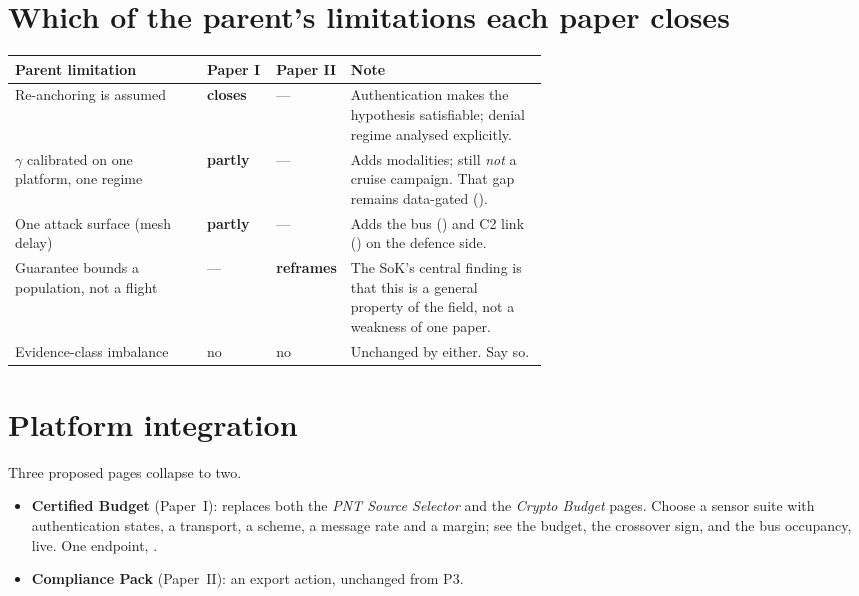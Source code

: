 \documentclass[11pt,a4paper]{article}
\begin{document}
\section{Which of the parent's limitations each paper closes}
\begin{center}\small
\begin{tabularx}{\linewidth}{@{}P{0.36\linewidth}P{0.13\linewidth}P{0.13\linewidth}Y@{}}
\toprule
\textbf{Parent limitation} & \textbf{Paper I} & \textbf{Paper II} & \textbf{Note} \\
\midrule
Re-anchoring is assumed & \textbf{closes} & --- & Authentication makes the
hypothesis satisfiable; denial regime analysed explicitly. \\
$\gamma$ calibrated on one platform, one regime & \textbf{partly} & --- &
Adds modalities; still \emph{not} a cruise campaign. That gap remains
data-gated (). \\
One attack surface (mesh delay) & \textbf{partly} & --- & Adds the bus
() and C2 link () on the defence side. \\
Guarantee bounds a population, not a flight & --- & \textbf{reframes} & The
SoK's central finding is that this is a general property of the field, not a
weakness of one paper. \\
Evidence-class imbalance & no & no & Unchanged by either. Say so. \\
\bottomrule
\end{tabularx}
\end{center}

\section{Platform integration}
Three proposed pages collapse to two.
\begin{itemize}
\item \textbf{Certified Budget} (Paper~I): replaces both the \emph{PNT Source
  Selector} and the \emph{Crypto Budget} pages. Choose a sensor suite with
  authentication states, a transport, a scheme, a message rate and a margin;
  see the budget, the crossover sign, and the bus occupancy, live. One
  endpoint, .
\item \textbf{Compliance Pack} (Paper~II): an export action, unchanged from P3.
\end{itemize}
\end{document}
